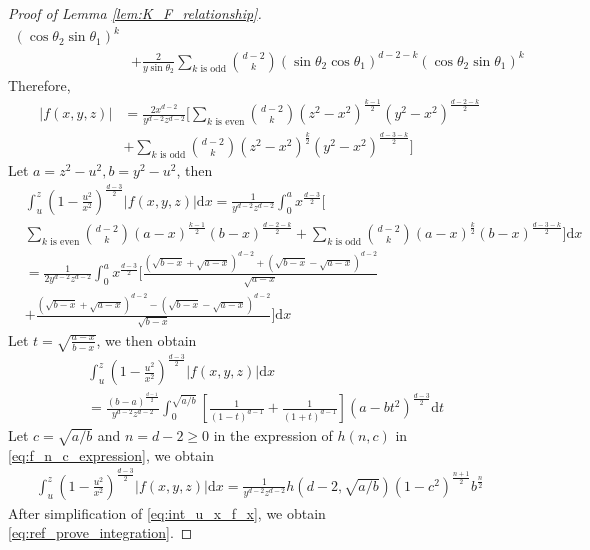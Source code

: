 \documentclass{aptpub}
\def\d{\mathrm{d}}
\begin{document}
\begin{proof}[Proof of Lemma \ref{lem:K_F_relationship}]
\begin{align*}
(\cos\theta_2 \sin\theta_1)^k \\
&+\frac{2}{y\sin\theta_2} \sum_{k \textrm{ is odd}}
\binom{d-2}{k} (\sin\theta_2\cos\theta_1)^{d-2-k}
(\cos\theta_2 \sin\theta_1)^k
\end{align*}
Therefore,
\begin{align*}
|f(x,y,z)|
&= \frac{2x^{d-2}}{y^{d-2}z^{d-2}}
\Big[
     \sum_{k \textrm{ is even}}
     \binom{d-2}{k} (z^2-x^2)^{\frac{k-1}{2}}
     (y^2-x^2)^{\frac{d-2-k}{2}}\\
    &+ \sum_{k \textrm{ is odd}}
    \binom{d-2}{k}    (z^2-x^2)^{\frac{k}{2}}
    (y^2-x^2)^{\frac{d-3-k}{2}}
\Big]
\end{align*}
Let $a=z^2-u^2, b=y^2-u^2$, then
\begin{align*}
     &\int_u^z (1-\frac{u^2}{x^2})^{\frac{d-3}{2}}
     |f(x,y,z)|\d x
     =\frac{1}{y^{d-2}z^{d-2}}
     \int_0^a x^{\frac{d-3}{2}}\Big[ \\
     &\sum_{k \textrm{ is even}}
     \binom{d-2}{k} (a-x)^{\frac{k-1}{2}}
     (b-x)^{\frac{d-2-k}{2}}
     + \sum_{k \textrm{ is odd}}
     \binom{d-2}{k} (a-x)^{\frac{k}{2}}
     (b-x)^{\frac{d-3-k}{2}}
     \Big]\d x\\
     &=\frac{1}{2y^{d-2}z^{d-2}}
     \int_0^a x^{\frac{d-3}{2}}\Big[\frac{(\sqrt{b-x} + \sqrt{a-x})^{d-2}+(\sqrt{b-x} - \sqrt{a-x})^{d-2}}{\sqrt{a-x}}\\
     &+\frac{(\sqrt{b-x} + \sqrt{a-x})^{d-2}-(\sqrt{b-x} - \sqrt{a-x})^{d-2}}{\sqrt{b-x}}\Big] \d x
\end{align*}
Let $t=\sqrt{\frac{a-x}{b-x}}$, we then obtain
\begin{align*}
     &\int_u^z (1-\frac{u^2}{x^2})^{\frac{d-3}{2}}
     |f(x,y,z)|\d x \\
     &=\frac{(b-a)^{\frac{d-1}{2}}}{y^{d-2}z^{d-2}}\int_0^{\sqrt{a/b}}
     \left[\frac{1}{(1-t)^{d-1}}+\frac{1}{(1+t)^{d-1}}\right](a-bt^2)^{\frac{d-3}{2}}\d t
\end{align*}
Let $c=\sqrt{a/b}$ and $n=d-2\geq 0$ in the expression of $h(n,c)$ in \eqref{eq:f_n_c_expression},
we obtain
\begin{align}\label{eq:int_u_x_f_x}
     \int_u^z (1-\frac{u^2}{x^2})^{\frac{d-3}{2}}
     |f(x,y,z)|\d x
     = \frac{1}{y^{d-2}z^{d-2}}h(d-2, \sqrt{a/b}) (1-c^2)^{\frac{n+1}{2}}b^{\frac{n}{2}}
\end{align}
After simplification of \eqref{eq:int_u_x_f_x}, we obtain \eqref{eq:ref_prove_integration}.
\end{proof}
\end{document}
